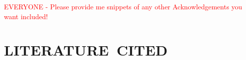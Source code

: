 \documentclass[letterpaper,draft]{ar-1col}
\newcommand{\textred}[1]{\textcolor{red}{ #1}}
\begin{document}
\textred{EVERYONE - Please provide me snippets of any other Acknowledgements you want included!}

%
\section*{LITERATURE\ CITED}








 

\end{document}
